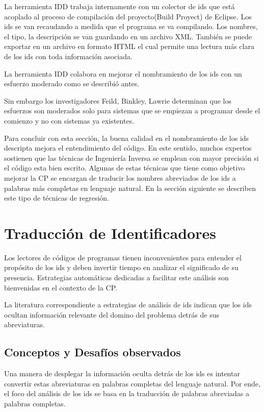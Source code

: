 \documentclass[a4paper,12pt]{report}
\begin{document}
La herramienta IDD trabaja internamente con un colector de ids que está acoplado al proceso de compilación del proyecto(Build Proyect) de Eclipse. Los ids se van recaudando a medida que el programa se va compilando. Los nombres, el tipo, la descripción se van guardando en un archivo XML. También se puede exportar en un archivo en formato HTML el cual permite una lectura más clara de los ids con toda información asociada\cite{DFPM05}.



La herramienta IDD colabora en mejorar el nombramiento de los ids con un esfuerzo moderado como se describió antes. 

Sin embargo los investigadores Feild, Binkley, Lawrie\cite{LFBEX07,DLHD06} determinan que los esfuerzos son moderados solo para sistemas que se empiezan a programar desde el comienzo y no con sistemas ya existentes.

Para concluir con esta sección, la buena calidad en el nombramiento de los ids descripta mejora el entendimiento del código. En este sentido, muchos expertos sostienen que las técnicas de Ingeniería Inversa se emplean con mayor precisión si el código esta bien escrito. Algunas de estas técnicas que tiene como objetivo mejorar la CP se encargan de traducir los nombres abreviados de los ids a palabras más completas en lenguaje natural. En la sección siguiente se describen este tipo de técnicas de regresión.

\pagebreak
\section{Traducción de Identificadores}

Los lectores de códigos de programas tienen inconvenientes para entender el propósito de los ids y deben invertir tiempo en analizar el significado de su presencia. Estrategias automáticas dedicadas a facilitar este análisis son bienvenidas en el contexto de la CP.

La literatura correspondiente a estrategias de análisis de ids indican que los ids ocultan información relevante del domino del problema detrás de sus abreviaturas\cite{EHPV09,LFBEX07}. 

\subsection{Conceptos y Desafíos observados}

Una manera de desplegar la información oculta detrás de los ids es intentar convertir estas abreviaturas en palabras completas del lenguaje natural. Por ende, el foco del análisis de los ids se basa en la traducción de palabras abreviadas a palabras completas.
\end{document}
